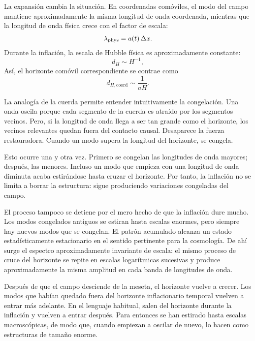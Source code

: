 La expansión cambia la situación. En coordenadas comóviles, el modo del campo mantiene aproximadamente la misma longitud de onda coordenada, mientras que la longitud de onda física crece con el factor de escala:
\begin{equation}
\lambda_{\rm phys}=a(t)\,\Delta x.
\end{equation}
Durante la inflación, la escala de Hubble física es aproximadamente constante:
\begin{equation}
d_H\sim H^{-1},
\end{equation}
Así, el horizonte comóvil correspondiente se contrae como
\begin{equation}
d_{H,\mathrm{coord}}\sim \frac{1}{aH}.
\end{equation}

La analogía de la cuerda permite entender intuitivamente la congelación. Una onda oscila porque cada segmento de la cuerda es atraído por los segmentos vecinos. Pero, si la longitud de onda llega a ser tan grande como el horizonte, los vecinos relevantes quedan fuera del contacto causal. Desaparece la fuerza restauradora. Cuando un modo supera la longitud del horizonte, se congela.

Esto ocurre una y otra vez. Primero se congelan las longitudes de onda mayores; después, las menores. Incluso un modo que empieza con una longitud de onda diminuta acaba estirándose hasta cruzar el horizonte. Por tanto, la inflación no se limita a borrar la estructura: sigue produciendo variaciones congeladas del campo.

El proceso tampoco se detiene por el mero hecho de que la inflación dure mucho. Los modos congelados antiguos se estiran hasta escalas enormes, pero siempre hay nuevos modos que se congelan. El patrón acumulado alcanza un estado estadísticamente estacionario en el sentido pertinente para la cosmología. De ahí surge el espectro aproximadamente invariante de escala: el mismo proceso de cruce del horizonte se repite en escalas logarítmicas sucesivas y produce aproximadamente la misma amplitud en cada banda de longitudes de onda.

Después de que el campo desciende de la meseta, el horizonte vuelve a crecer. Los modos que habían quedado fuera del horizonte inflacionario temporal vuelven a entrar más adelante. En el lenguaje habitual, salen del horizonte durante la inflación y vuelven a entrar después. Para entonces se han estirado hasta escalas macroscópicas, de modo que, cuando empiezan a oscilar de nuevo, lo hacen como estructuras de tamaño enorme.

